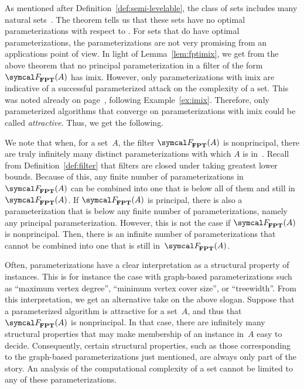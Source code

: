 As mentioned after Definition~\ref{def:semi-levelable}, the class of  sets includes many natural sets~\parencite{orponen1986optimal}.
The theorem tells us that these sets have no optimal parameterizations with respect to .
For sets that do have optimal parameterizations, the parameterizations are not very promising from an applications point of view.
In light of Lemma~\ref{lem:fptimix}, we get from the above theorem that no principal parameterization in a filter of the form $\calF_\cl{FPT}(A)$ has imix.
However, only parameterizations with imix are indicative of a successful parameterized attack on the complexity of a set.
This was noted already on page~\pageref{p:imix}, following Example~\ref{ex:imix}.
Therefore, only parameterized algorithms that converge on parameterizations with imix could be called \emph{attractive}.
Thus, we get the following.
%

We note that when, for a set~$A$, the filter $\calF_\cl{FPT}(A)$ is nonprincipal, there are truly infinitely many distinct parameterizations with which $A$ is in~.
Recall from Definition~\ref{def:filter} that filters are closed under taking greatest lower bounds.
Because of this, any finite number of parameterizations in~$\calF_\cl{FPT}(A)$ can be combined into one that is below all of them and still in~$\calF_\cl{FPT}(A)$.
If $\calF_\cl{FPT}(A)$ is principal, there is also a parameterization that is below any finite number of parameterizations, namely any principal parameterization.
However, this is not the case if $\calF_\cl{FPT}(A)$ is nonprincipal.
Then, there is an infinite number of parameterizations that cannot be combined into one that is still in~$\calF_\cl{FPT}(A)$.

Often, parameterizations have a clear interpretation as a structural property of instances.
This is for instance the case with graph-based parameterizations such as \enquote{maximum vertex degree}, \enquote{minimum vertex cover size}, or \enquote{treewidth}.
From this interpretation, we get an alternative take on the above slogan.
Suppose that a parameterized algorithm is attractive for a set~$A$, and thus that $\calF_\cl{FPT}(A)$ is nonprincipal.
In that case, there are infinitely many structural properties that may make membership of an instance in~$A$ easy to decide.
Consequently, certain structural properties, such as those corresponding to the graph-based parameterizations just mentioned, are always only part of the story.
An analysis of the computational complexity of a set cannot be limited to any of these parameterizations.

